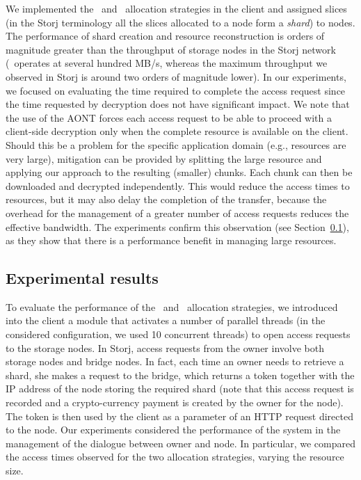 We implemented the \diagonal\ and \compact\ allocation strategies in
the client and assigned slices (in the Storj terminology all the
slices allocated to a node form a {\em shard\/}) to nodes. The
performance of shard creation and resource reconstruction is orders of
magnitude greater than the throughput of storage nodes in the Storj
network (\name\ operates at several hundred MB/s, whereas the maximum
throughput we observed in Storj is around two orders of magnitude
lower). In our experiments, we focused on evaluating the time required
to complete the access request since the time requested by decryption
does not have significant impact.  We note that the use of the AONT
forces each access request to be able to proceed with a client-side
decryption only when the complete resource is available on the client.
Should this be a problem for the specific application domain (e.g.,
resources are very large), mitigation can be provided by splitting the
large resource and applying our approach to the resulting (smaller)
chunks. Each chunk can then be downloaded and decrypted
independently. This would reduce the access times to resources, but it
may also delay the completion of the transfer, because the overhead
for the management of a greater number of access requests reduces the
effective bandwidth. The experiments confirm this observation (see
Section~\ref{dcs:ss:results}), as they show that there is a performance
benefit in managing large resources.


\subsection{Experimental results}\label{dcs:ss:results}
To evaluate the performance of the \diagonal\ and \compact\ allocation
strategies, we introduced into the client a module that activates a
number of parallel threads (in the considered configuration, we used
10 concurrent threads) to open access requests to the storage
nodes. In Storj, access requests from the owner involve both storage
nodes and bridge nodes. In fact, each time an owner needs to retrieve
a shard, she makes a request to the bridge, which returns a token
together with the IP address of the node storing the required shard
(note that this access request is recorded and a crypto-currency
payment is created by the owner for the node). The token is then used
by the client as a parameter of an HTTP request directed to the node.
Our experiments considered the performance of the system in the
management of the dialogue between owner and node. In particular, we
compared the access times observed for the two allocation strategies,
varying the resource size.

